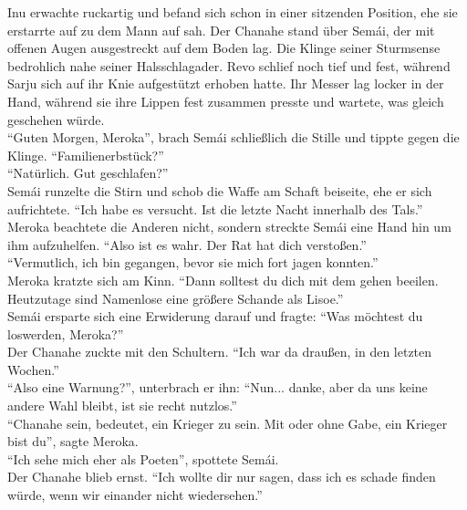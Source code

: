 Inu erwachte ruckartig und befand sich schon in einer sitzenden Position, ehe sie erstarrte auf zu 
dem Mann auf sah. Der Chanahe stand über Semái, der mit offenen Augen ausgestreckt auf dem Boden 
lag. Die Klinge seiner Sturmsense bedrohlich nahe seiner Halsschlagader.  Revo schlief noch tief 
und fest, während Sarju sich auf ihr Knie aufgestützt erhoben hatte. Ihr Messer lag locker in der 
Hand, während sie ihre Lippen fest zusammen presste und wartete, was gleich geschehen würde.\\
``Guten Morgen, Meroka'', brach Semái schließlich die Stille und tippte gegen die Klinge. 
``Familienerbstück?''\\
``Natürlich. Gut geschlafen?''\\
Semái runzelte die Stirn und schob die Waffe am Schaft beiseite, ehe er sich aufrichtete. ``Ich 
habe es versucht. Ist die letzte Nacht innerhalb des Tals.''\\
Meroka beachtete die Anderen nicht, sondern streckte Semái eine Hand hin um ihm aufzuhelfen. ``Also 
ist es wahr. Der Rat hat dich verstoßen.''\\
``Vermutlich, ich bin gegangen, bevor sie mich fort jagen konnten.''\\
Meroka kratzte sich am Kinn. ``Dann solltest du dich mit dem gehen beeilen. Heutzutage sind 
Namenlose eine größere Schande als Lisoe.''\\
Semái ersparte sich eine Erwiderung darauf und fragte: ``Was möchtest du loswerden, Meroka?''\\
Der Chanahe zuckte mit den Schultern. ``Ich war da draußen, in den letzten Wochen.''\\
``Also eine Warnung?'', unterbrach er ihn: ``Nun... danke, aber da uns keine andere Wahl bleibt, 
ist sie recht nutzlos.''\\
``Chanahe sein, bedeutet, ein Krieger zu sein. Mit oder ohne Gabe, ein Krieger bist du'', sagte 
Meroka.\\
``Ich sehe mich eher als Poeten'', spottete Semái.\\
Der Chanahe blieb ernst. ``Ich wollte dir nur sagen, dass ich es schade finden würde, wenn wir 
einander nicht wiedersehen.''\\


